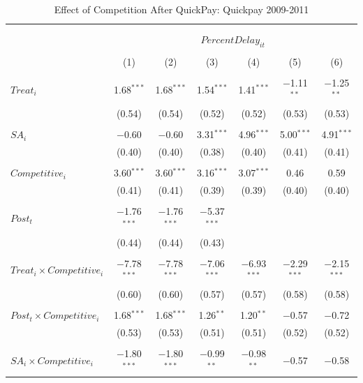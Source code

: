 \documentclass[
]{article}
\begin{document}
\begin{table}[H] \centering 
  \caption{Effect of Competition After QuickPay: Quickpay 2009-2011} 
  \label{} 
\small 
\begin{tabular}{@{\extracolsep{-3pt}}lcccccc} 
\\[-1.8ex]\hline 
\hline \\[-1.8ex] 
\\[-1.8ex] & \multicolumn{6}{c}{$PercentDelay_{it}$  } \\ 
\\[-1.8ex] & (1) & (2) & (3) & (4) & (5) & (6)\\ 
\hline \\[-1.8ex] 
 $Treat_i$ & 1.68$^{***}$ & 1.68$^{***}$ & 1.54$^{***}$ & 1.41$^{***}$ & $-$1.11$^{**}$ & $-$1.25$^{**}$ \\ 
  & (0.54) & (0.54) & (0.52) & (0.52) & (0.53) & (0.53) \\ 
  & & & & & & \\ 
 $SA_i$ & $-$0.60 & $-$0.60 & 3.31$^{***}$ & 4.96$^{***}$ & 5.00$^{***}$ & 4.91$^{***}$ \\ 
  & (0.40) & (0.40) & (0.38) & (0.40) & (0.41) & (0.41) \\ 
  & & & & & & \\ 
 $Competitive_i$ & 3.60$^{***}$ & 3.60$^{***}$ & 3.16$^{***}$ & 3.07$^{***}$ & 0.46 & 0.59 \\ 
  & (0.41) & (0.41) & (0.39) & (0.39) & (0.40) & (0.40) \\ 
  & & & & & & \\ 
 $Post_t$ & $-$1.76$^{***}$ & $-$1.76$^{***}$ & $-$5.37$^{***}$ &  &  &  \\ 
  & (0.44) & (0.44) & (0.43) &  &  &  \\ 
  & & & & & & \\ 
 $Treat_i \times Competitive_i$ & $-$7.78$^{***}$ & $-$7.78$^{***}$ & $-$7.06$^{***}$ & $-$6.93$^{***}$ & $-$2.29$^{***}$ & $-$2.15$^{***}$ \\ 
  & (0.60) & (0.60) & (0.57) & (0.57) & (0.58) & (0.58) \\ 
  & & & & & & \\ 
 $Post_t \times Competitive_i$ & 1.68$^{***}$ & 1.68$^{***}$ & 1.26$^{**}$ & 1.20$^{**}$ & $-$0.57 & $-$0.72 \\ 
  & (0.53) & (0.53) & (0.51) & (0.51) & (0.52) & (0.52) \\ 
  & & & & & & \\ 
 $SA_i \times Competitive_i$ & $-$1.80$^{***}$ & $-$1.80$^{***}$ & $-$0.99$^{**}$ & $-$0.98$^{**}$ & $-$0.57 & $-$0.58 \\ 

\end{tabular}
\end{table}
\end{document}
